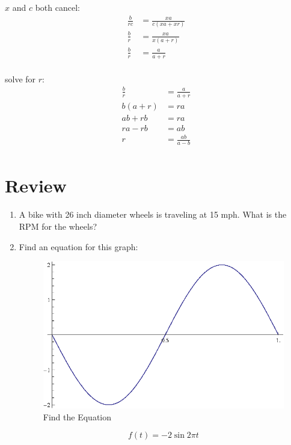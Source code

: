 \documentclass{exam}
\begin{document}
\begin{description}
      $x$ and $c$ both cancel:
      \begin{align*}
        \frac{b}{rc} & = \frac{xa}{c(xa + xr)} \\
        \frac{b}{r} & = \frac{xa}{x(a + r)} \\
        \frac{b}{r}  & = \frac{a}{a + r} \\
      \end{align*}

      solve for $r$:
      \begin{align*}
        \frac{b}{r} & = \frac{a}{a + r} \\
        b(a + r)    & = ra \\
        ab + rb     & = ra \\
        ra - rb     & = ab \\
        r           & = \frac{ab}{a - b} \\
      \end{align*}
  \end{description}

  \fi

  \section{Review}

  \begin{enumerate}
    \item A bike with 26 inch diameter wheels is traveling at 15 mph.  What is the RPM for the wheels?

    \item Find an equation for this graph:
      \begin{figure}[h]
        \centering
        \includegraphics[scale=0.7]{review.eps}
        \caption{Find the Equation}
      \end{figure}

      \begin{solution}
        \[
          f(t) = -2 \sin 2 \pi t
        \]
      \end{solution}

  \end{enumerate}
  
\end{document}
